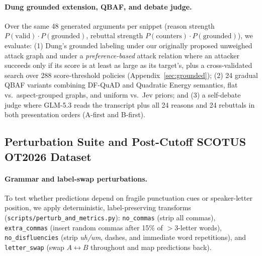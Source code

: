 \documentclass[11pt]{article}
\begin{document}
\paragraph{Dung grounded extension, QBAF, and debate judge.}
Over the same 48 generated arguments per snippet (reason strength $P(\textrm{valid})\cdot P(\textrm{grounded})$, rebuttal strength $P(\textrm{counters})\cdot P(\textrm{grounded})$), we evaluate:
(1) Dung's grounded labeling \citep{dung1995acceptability} under our originally proposed unweighed attack graph and under a \emph{preference-based} attack relation where an attacker succeeds only if its score is at least as large as its target's, plus a cross-validated search over 288 score-threshold policies (Appendix~\ref{sec:grounded});
(2) 24 gradual QBAF variants \citep{freedman2025argllm} combining DF-QuAD and Quadratic Energy semantics, flat vs.\ aspect-grouped graphs, and uniform vs.\ Jev priors; and
(3) a self-debate judge \citep{khan2024debating} where GLM-5.3 reads the transcript plus all 24 reasons and 24 rebuttals in both presentation orders (A-first and B-first).

\subsection{Perturbation Suite and Post-Cutoff SCOTUS OT2026 Dataset}
\label{sec:method-scotus}

\paragraph{Grammar and label-swap perturbations.}
To test whether predictions depend on fragile punctuation cues or speaker-letter position, we apply deterministic, label-preserving transforms (\texttt{scripts/perturb\_and\_metrics.py}): \texttt{no\_commas} (strip all commas), \texttt{extra\_commas} (insert random commas after 15\% of $>3$-letter words), \texttt{no\_disfluencies} (strip \emph{uh/um}, dashes, and immediate word repetitions), and \texttt{letter\_swap} (swap $A \leftrightarrow B$ throughout and map predictions back).
\end{document}

